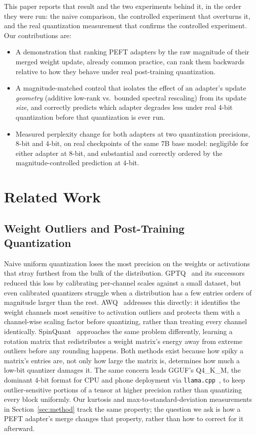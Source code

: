 \documentclass[conference]{IEEEtran}
\begin{document}
This paper reports that result and the two experiments behind it, in the order they were run: the naive comparison, the controlled experiment that overturns it, and the real quantization measurement that confirms the controlled experiment. Our contributions are:

\begin{itemize}[leftmargin=*]
    \item A demonstration that ranking PEFT adapters by the raw magnitude of their merged weight update, already common practice, can rank them backwards relative to how they behave under real post-training quantization.
    \item A magnitude-matched control that isolates the effect of an adapter's update \emph{geometry} (additive low-rank vs.\ bounded spectral rescaling) from its update \emph{size}, and correctly predicts which adapter degrades less under real 4-bit quantization before that quantization is ever run.
    \item Measured perplexity change for both adapters at two quantization precisions, 8-bit and 4-bit, on real checkpoints of the same 7B base model: negligible for either adapter at 8-bit, and substantial and correctly ordered by the magnitude-controlled prediction at 4-bit.
\end{itemize}

\section{Related Work}
\label{sec:related}

\subsection{Weight Outliers and Post-Training Quantization}

Naive uniform quantization loses the most precision on the weights or activations that stray furthest from the bulk of the distribution. GPTQ~\cite{gptq} and its successors reduced this loss by calibrating per-channel scales against a small dataset, but even calibrated quantizers struggle when a distribution has a few entries orders of magnitude larger than the rest. AWQ~\cite{awq} addresses this directly: it identifies the weight channels most sensitive to activation outliers and protects them with a channel-wise scaling factor before quantizing, rather than treating every channel identically. SpinQuant~\cite{spinquant} approaches the same problem differently, learning a rotation matrix that redistributes a weight matrix's energy away from extreme outliers before any rounding happens. Both methods exist because how spiky a matrix's entries are, not only how large the matrix is, determines how much a low-bit quantizer damages it. The same concern leads GGUF's Q4\_K\_M, the dominant 4-bit format for CPU and phone deployment via \texttt{llama.cpp}~\cite{llamacpp}, to keep outlier-sensitive portions of a tensor at higher precision rather than quantizing every block uniformly. Our kurtosis and max-to-standard-deviation measurements in Section~\ref{sec:method} track the same property; the question we ask is how a PEFT adapter's merge changes that property, rather than how to correct for it afterward.
\end{document}
